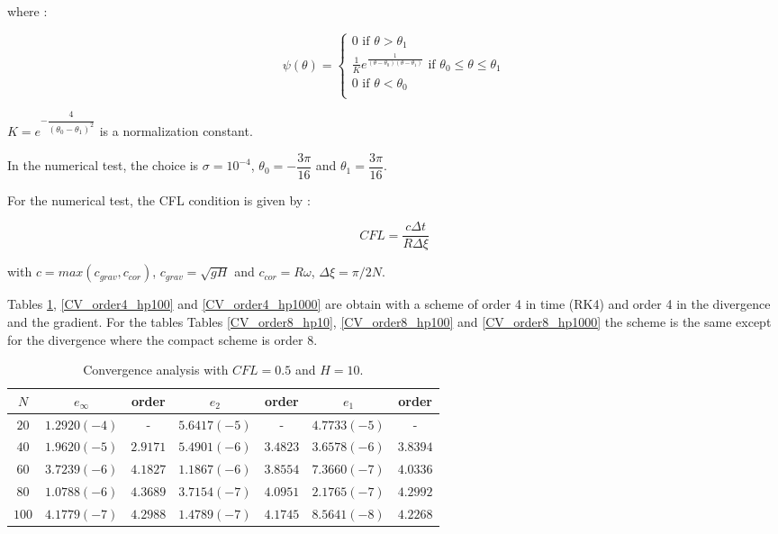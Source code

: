 \documentclass[10pt,a4paper]{amsart}
\begin{document}
where :

\begin{equation*}
\psi ( \theta ) = 
\left\lbrace
\begin{array}{l}
0 \text{ if } \theta > \theta_1\\
\frac{1}{K}e^{\frac{1}{(\theta - \theta_0)(\theta-\theta_1)}} \text{ if } \theta_0 \leq \theta \leq \theta_1 \\
0 \text{ if } \theta < \theta_0\\
 
\end{array}
\right.
\end{equation*}

$K = e^{-\dfrac{4}{(\theta_0 - \theta_1)^2}}$ is a normalization constant.

In the numerical test, the choice is $\sigma = 10^{-4}$, $\theta_0 = -\dfrac{3 \pi}{16}$ and $\theta_1 = \dfrac{3 \pi}{16}$.

For the numerical test, the CFL condition is given by :

\begin{equation}
CFL = \dfrac{c \Delta t}{R \Delta \xi}
\end{equation}

with $c = max(c_{grav}, c_{cor})$, $c_{grav} = \sqrt{gH}$ and $c_{cor} = R \omega$, $\Delta \xi = \pi / 2N$.

Tables \ref{CV_order4_hp10}, \ref{CV_order4_hp100} and \ref{CV_order4_hp1000} are obtain with a scheme of order 4 in time (RK4) and order 4 in the divergence and the gradient. For the tables Tables \ref{CV_order8_hp10}, \ref{CV_order8_hp100} and \ref{CV_order8_hp1000} the scheme is the same except for the divergence where the compact scheme is order 8.

\begin{table}
\begin{tabular}{c|c|c|c|c|c|c}
$N$ & $e_{\infty}$ & order & $e_2$ & order & $e_1$ & order \\ 
\hline 
\hline
$20$ & $1.2920 (-4)$ & - & $5.6417 (-5)$ & - & $4.7733 (-5)$ & - \\ 
\hline 
$40$ & $1.9620 (-5)$ & $2.9171$ & $5.4901 (-6)$ & $3.4823$ & $3.6578 (-6)$ & $3.8394$ \\ 
\hline 
$60$ & $3.7239 (-6)$ & $4.1827$ & $1.1867 (-6)$ & $3.8554$ & $7.3660 (-7)$ & $4.0336$ \\
\hline 
$80$ & $1.0788 (-6)$ & $4.3689$ & $3.7154 (-7)$ & $4.0951$ & $2.1765 (-7)$ & $4.2992$ \\ 
\hline 
$100$ & $4.1779(-7)$ & $4.2988$ & $1.4789 (-7)$ & $4.1745$ & $8.5641 (-8)$ & $4.2268$  \\ 
\end{tabular} 
\caption{Convergence analysis with $CFL=0.5$ and $H=10$.}
\label{CV_order4_hp10}
\end{table}
\end{document}
